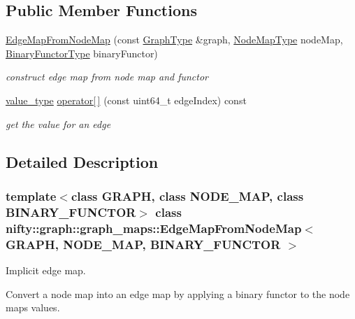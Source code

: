 \subsection*{Public Member Functions}
\begin{DoxyCompactItemize}
\item 
\hyperlink{classnifty_1_1graph_1_1graph__maps_1_1EdgeMapFromNodeMap_abf8972db1d22bc00d2afd5cf5cb0b6a3}{Edge\+Map\+From\+Node\+Map} (const \hyperlink{classnifty_1_1graph_1_1graph__maps_1_1EdgeMapFromNodeMap_a551dfc3ef2c5293f5306420d129da574}{Graph\+Type} \&graph, \hyperlink{classnifty_1_1graph_1_1graph__maps_1_1EdgeMapFromNodeMap_ad2639421843e9da9afe18b0b35a7317e}{Node\+Map\+Type} node\+Map, \hyperlink{classnifty_1_1graph_1_1graph__maps_1_1EdgeMapFromNodeMap_a0fbb6e9a54ecf31d27e13db4f274a6d1}{Binary\+Functor\+Type} binary\+Functor)
\begin{DoxyCompactList}\small\item\em construct edge map from node map and functor \end{DoxyCompactList}\item 
\hyperlink{classnifty_1_1graph_1_1graph__maps_1_1EdgeMapFromNodeMap_abc24027c855755008ba3694cc49999c2}{value\+\_\+type} \hyperlink{classnifty_1_1graph_1_1graph__maps_1_1EdgeMapFromNodeMap_adf1a5ff485dd986c6ab91eefcf3ff794}{operator\mbox{[}$\,$\mbox{]}} (const uint64\+\_\+t edge\+Index) const
\begin{DoxyCompactList}\small\item\em get the value for an edge \end{DoxyCompactList}\end{DoxyCompactItemize}


\subsection{Detailed Description}
\subsubsection*{template$<$class G\+R\+A\+PH, class N\+O\+D\+E\+\_\+\+M\+AP, class B\+I\+N\+A\+R\+Y\+\_\+\+F\+U\+N\+C\+T\+OR$>$\newline
class nifty\+::graph\+::graph\+\_\+maps\+::\+Edge\+Map\+From\+Node\+Map$<$ G\+R\+A\+P\+H, N\+O\+D\+E\+\_\+\+M\+A\+P, B\+I\+N\+A\+R\+Y\+\_\+\+F\+U\+N\+C\+T\+O\+R $>$}

Implicit edge map. 

Convert a node map into an edge map by applying a binary functor to the node maps values.


